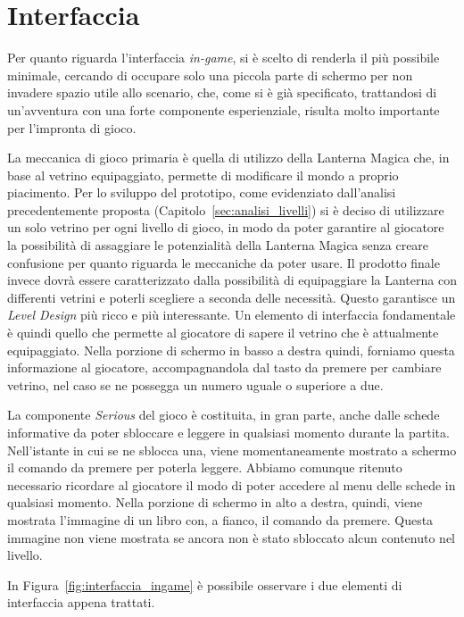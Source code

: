 \section{Interfaccia}
\label{sec:design_interfaccia}

Per quanto riguarda l’interfaccia \textit{in-game}, si è scelto di renderla il più possibile minimale, cercando di occupare solo una piccola parte di schermo per non invadere spazio utile allo scenario, che, come si è già specificato, trattandosi di un’avventura con una forte componente esperienziale, risulta molto importante per l’impronta di gioco.

La meccanica di gioco primaria è quella di utilizzo della Lanterna Magica che, in base al vetrino equipaggiato, permette di modificare il mondo a proprio piacimento. Per lo sviluppo del prototipo, come evidenziato dall’analisi precedentemente proposta (Capitolo~\ref{sec:analisi_livelli}) si è deciso di utilizzare un solo vetrino per ogni livello di gioco, in modo da poter garantire al giocatore la possibilità di assaggiare le potenzialità della Lanterna Magica senza creare confusione per quanto riguarda le meccaniche da poter usare.
Il prodotto finale invece dovrà essere caratterizzato dalla possibilità di equipaggiare la Lanterna con differenti vetrini e poterli scegliere a seconda delle necessità. Questo garantisce un \textit{Level Design} più ricco e più interessante.
Un elemento di interfaccia fondamentale è quindi quello che permette al giocatore di sapere il vetrino che è attualmente equipaggiato.
Nella porzione di schermo in basso a destra quindi, forniamo questa informazione al giocatore, accompagnandola dal tasto da premere per cambiare vetrino, nel caso se ne possegga un numero uguale o superiore a due.

La componente \textit{Serious} del gioco è costituita, in gran parte, anche dalle schede informative da poter sbloccare e leggere in qualsiasi momento durante la partita. Nell’istante in cui se ne sblocca una, viene momentaneamente mostrato a schermo il comando da premere per poterla leggere. Abbiamo comunque ritenuto necessario ricordare al giocatore il modo di poter accedere al menu delle schede in qualsiasi momento.  Nella porzione di schermo in alto a destra, quindi, viene mostrata l’immagine di un libro con, a fianco, il comando da premere. Questa immagine non viene mostrata se ancora non è stato sbloccato alcun contenuto nel livello.

In Figura~\ref{fig:interfaccia_ingame} è possibile osservare i due elementi di interfaccia appena trattati.

